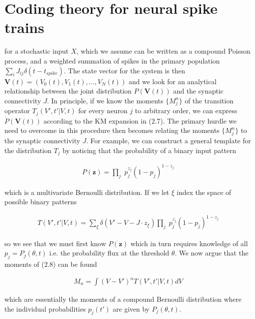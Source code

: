 \documentclass{ucetd}
\begin{document}
\section{Coding theory for neural spike trains}


for a stochastic input $X$, which we assume can be written as a compound Poisson process, and a weighted summation of spikes in the primary population $\sum_{i}J_{ij}\delta(t-t_{spike})$. The state vector for the system is then $\mathbf{V}(t) = (V_{0}(t), V_{1}(t), ..., V_{N}(t))$ and we look for an analytical relationship between the joint distribution $P(\mathbf{V}(t))$ and the synaptic connectivity $J$. In principle, if we know the moments $\{M_{j}^{n}\}$  of the transition operator $T_{j}(V',t'|V,t)$ for every neuron $j$ to arbitrary order, we can express $\dot{P}(\mathbf{V}(t))$ according to the KM expansion in (2.7). The primary hurdle we need to overcome in this procedure then becomes relating the moments $\{M_{j}^{n}\}$ to the synaptic connectivity $J$. For example, we can construct a general template for the distribution $T_{j}$ by noticing that the probability of a binary input pattern

\begin{align*}
P(\mathbf{z}) = \underset{j}{\prod} \; p_{j}^{z_{j}}(1-p_{j})^{1-z_{j}}
\end{align*}

which is a multivariate Bernoulli distribution. If we let $\xi$ index the space of possible binary patterns

\begin{align}
T(V',t'|V,t) = \sum_{\xi} \delta(V'- V - J\cdot z_{\xi})\underset{j}{\prod} \; p_{j}^{z_{j}}(1-p_{j})^{1-z_{j}}
\end{align}

so we see that we must first know $P(\mathbf{z})$ which in turn requires knowledge of all $p_{j} = P_{j}(\theta, t)$ i.e. the probability flux at the threshold $\theta$. We now argue that the moments of (2.8) can be found 

\begin{align}
M_{n} = \int (V-V')^{n} T(V',t'|V,t) dV
\end{align}

which are essentially the moments of a compound Bernoulli distribution where the individual probabilities $p_{j}(t')$ are given by $P_{j}(\theta, t)$.
\end{document}
